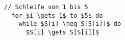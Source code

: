 \begin{lstlisting}[style=pseudo,gobble=2]
  // Schleife von 1 bis 5
  for $i \gets 1$ to $5$ do
    while $S[i] \neq S[S[i]]$ do
      $S[i] \gets S[S[i]]$
\end{lstlisting}